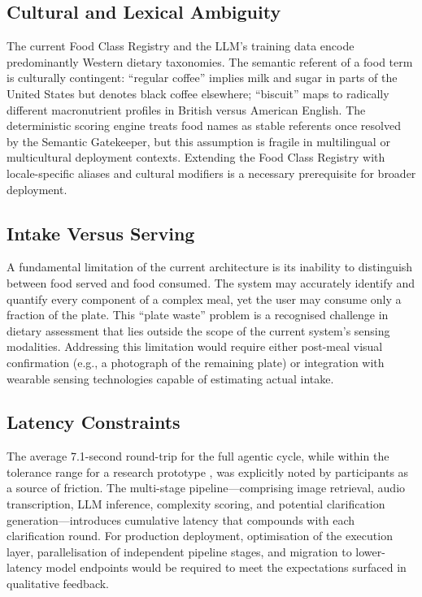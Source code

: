 \subsection{Cultural and Lexical Ambiguity}

The current Food Class Registry and the LLM's training data encode predominantly Western dietary taxonomies. The semantic referent of a food term is culturally contingent: ``regular coffee'' implies milk and sugar in parts of the United States but denotes black coffee elsewhere; ``biscuit'' maps to radically different macronutrient profiles in British versus American English. The deterministic scoring engine treats food names as stable referents once resolved by the Semantic Gatekeeper, but this assumption is fragile in multilingual or multicultural deployment contexts. Extending the Food Class Registry with locale-specific aliases and cultural modifiers is a necessary prerequisite for broader deployment.

\subsection{Intake Versus Serving}

A fundamental limitation of the current architecture is its inability to distinguish between food served and food consumed. The system may accurately identify and quantify every component of a complex meal, yet the user may consume only a fraction of the plate. This ``plate waste'' problem is a recognised challenge in dietary assessment \citep{moshfeghUSDepartmentAgriculture2008} that lies outside the scope of the current system's sensing modalities. Addressing this limitation would require either post-meal visual confirmation (e.g., a photograph of the remaining plate) or integration with wearable sensing technologies capable of estimating actual intake.

\subsection{Latency Constraints}

The average 7.1-second round-trip for the full agentic cycle, while within the tolerance range for a research prototype \citep{nahStudyTolerableWaiting2004}, was explicitly noted by participants as a source of friction. The multi-stage pipeline---comprising image retrieval, audio transcription, LLM inference, complexity scoring, and potential clarification generation---introduces cumulative latency that compounds with each clarification round. For production deployment, optimisation of the execution layer, parallelisation of independent pipeline stages, and migration to lower-latency model endpoints would be required to meet the expectations surfaced in qualitative feedback.

